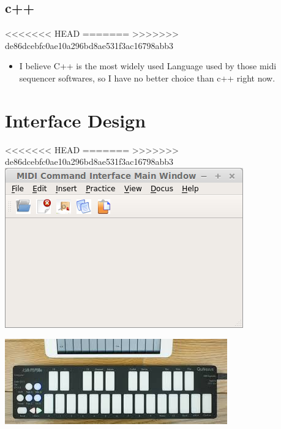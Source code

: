 \documentclass[9pt,b5paper]{article}
\begin{document}
\subsection{c++}
<<<<<<< HEAD
\label{sec-14-2}
=======
\label{sec-13-2}
>>>>>>> de86dcebfc0ae10a296bd8ae531f3ac16798abb3
\begin{itemize}
\item I believe C++ is the most widely used Language used by those midi sequencer softwares, so I have no better choice than c++ right now.
\end{itemize}
\section{Interface Design}
<<<<<<< HEAD
\label{sec-15}
=======
\label{sec-14}
>>>>>>> de86dcebfc0ae10a296bd8ae531f3ac16798abb3
\includegraphics[width=.9\linewidth]{./pic/menu.png}

\includegraphics[width=.9\linewidth]{./pic/midi.jpg}
\end{document}
